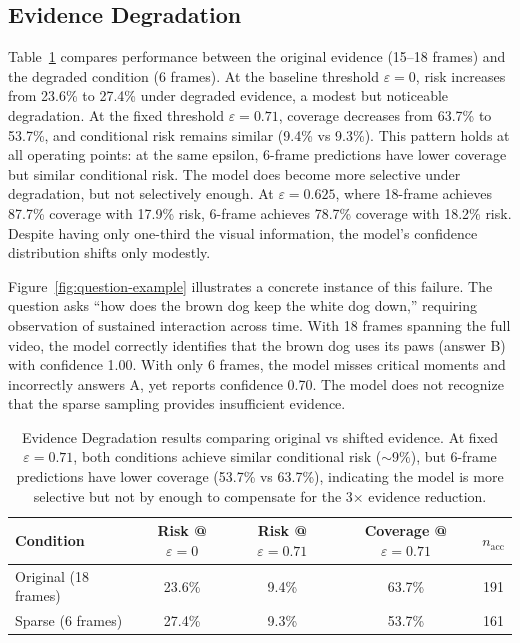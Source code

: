 \documentclass{article}
\begin{document}
\subsection{Evidence Degradation}

Table~\ref{tab:degradation-results} compares performance between the original evidence (15--18 frames) and the degraded condition (6 frames). At the baseline threshold $\varepsilon=0$, risk increases from 23.6\% to 27.4\% under degraded evidence, a modest but noticeable degradation. At the fixed threshold $\varepsilon=0.71$, coverage decreases from 63.7\% to 53.7\%, and conditional risk remains similar (9.4\% vs 9.3\%). This pattern holds at all operating points: at the same epsilon, 6-frame predictions have lower coverage but similar conditional risk. The model does become more selective under degradation, but not selectively enough. At $\varepsilon=0.625$, where 18-frame achieves 87.7\% coverage with 17.9\% risk, 6-frame achieves 78.7\% coverage with 18.2\% risk. Despite having only one-third the visual information, the model's confidence distribution shifts only modestly.

Figure~\ref{fig:question-example} illustrates a concrete instance of this failure. The question asks ``how does the brown dog keep the white dog down,'' requiring observation of sustained interaction across time. With 18 frames spanning the full video, the model correctly identifies that the brown dog uses its paws (answer B) with confidence 1.00. With only 6 frames, the model misses critical moments and incorrectly answers A, yet reports confidence 0.70. The model does not recognize that the sparse sampling provides insufficient evidence.

\begin{table}[h]
\centering
\begin{tabular}{lcccc}
\toprule
\textbf{Condition} & \textbf{Risk @ $\varepsilon=0$} & \textbf{Risk @ $\varepsilon=0.71$} & \textbf{Coverage @ $\varepsilon=0.71$} & \textbf{$n_{\text{acc}}$} \\
\midrule
Original (18 frames) & 23.6\% & 9.4\% & 63.7\% & 191 \\
Sparse (6 frames) & 27.4\% & 9.3\% & 53.7\% & 161 \\
\bottomrule
\end{tabular}
\caption{\small Evidence Degradation results comparing original vs shifted evidence. At fixed $\varepsilon=0.71$, both conditions achieve similar conditional risk ($\sim$9\%), but 6-frame predictions have lower coverage (53.7\% vs 63.7\%), indicating the model is more selective but not by enough to compensate for the 3$\times$ evidence reduction.}
\label{tab:degradation-results}
\end{table}
\end{document}
